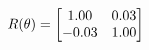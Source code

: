 \documentclass[preview]{standalone}
\begin{document}
\begin{align*}
\special{dvisvgm:raw <g id='unique000'>}R(\theta) = \begin{bmatrix}1.00 & 0.03\\-0.03 & 1.00\end{bmatrix}\special{dvisvgm:raw </g>}
\end{align*}
\end{document}
